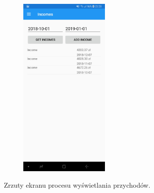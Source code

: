 \begin{figure}[!ht]
\begin{center}
\begin{subfigure}[b]{0.3\textwidth}
			\label{przychody}
		\end{subfigure}
		\begin{subfigure}[b]{0.3\textwidth}
			\includegraphics[width=1.75in]{img/mobile/przychody_gotowe.jpg}
			\label{przychody_gotowe}
		\end{subfigure}
	\end{center}
	\caption{Zrzuty ekranu procesu wyświetlania przychodów.}
\end{figure}

